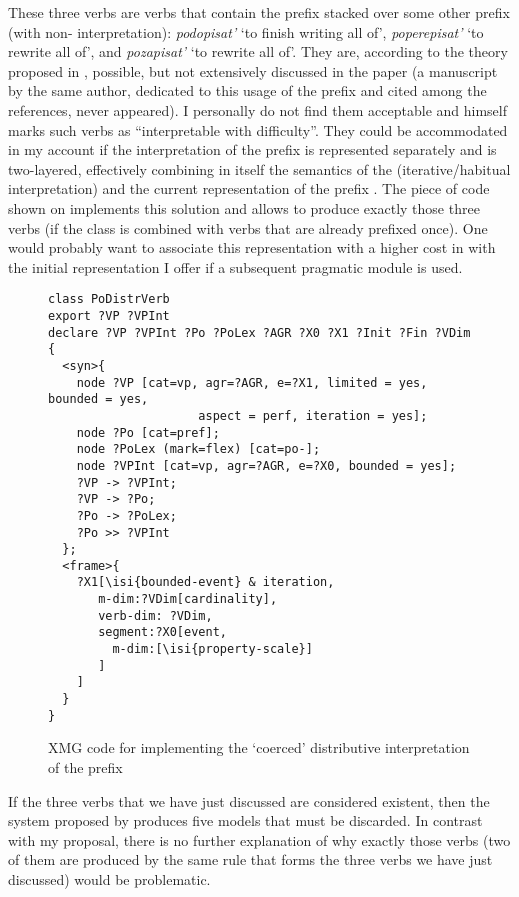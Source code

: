 These three verbs are verbs that contain the  prefix  stacked over some other prefix (with non- interpretation): \textit{podopisat'} `to finish writing all of', \textit{poperepisat'} `to rewrite all of', and  \textit{pozapisat'} `to rewrite all of'. They are, according to the theory proposed in \citet{Tatevosov:09}, possible, but not extensively discussed in the paper (a manuscript by the same author, dedicated to this usage of the prefix and cited among the references, never appeared). I personally do not find them acceptable and \citet[143]{Tatevosov:09} himself marks such verbs as ``interpretable with difficulty''. They could be accommodated in my account if the  interpretation of the prefix  is represented separately and is two-layered, effectively combining in itself the semantics of the  (iterative/habitual interpretation) and the current representation of the prefix . The piece of code shown on  implements this solution and allows to produce exactly those three verbs (if the class is combined with verbs that are already prefixed once). One would probably want to associate this representation with a higher cost in  with the initial representation I offer if a subsequent pragmatic module is used.

\begin{figure}
\begin{lstlisting}[style=xmg,basicstyle=\ttfamily\small]
class PoDistrVerb
export ?VP ?VPInt
declare ?VP ?VPInt ?Po ?PoLex ?AGR ?X0 ?X1 ?Init ?Fin ?VDim
{
  <syn>{
    node ?VP [cat=vp, agr=?AGR, e=?X1, limited = yes, bounded = yes, 
    				 aspect = perf, iteration = yes];
    node ?Po [cat=pref];
    node ?PoLex (mark=flex) [cat=po-];
    node ?VPInt [cat=vp, agr=?AGR, e=?X0, bounded = yes];
    ?VP -> ?VPInt;
    ?VP -> ?Po;
    ?Po -> ?PoLex;
    ?Po >> ?VPInt
  };
  <frame>{
    ?X1[\isi{bounded-event} & iteration,
       m-dim:?VDim[cardinality],
       verb-dim: ?VDim,
       segment:?X0[event,
         m-dim:[\isi{property-scale}]
       ]
    ]
  }
}
\end{lstlisting}
\caption{XMG code for implementing the `coerced' distributive interpretation of the prefix \label{xmg:podistr}}
\end{figure}

If the three verbs that we have just discussed are considered existent, then the  system proposed by \citet{Tatevosov:09} produces five models that must be discarded. In contrast with my proposal, there is no further explanation of why exactly those verbs (two of them are produced by the same rule that forms the three verbs we have just discussed) would be problematic.

